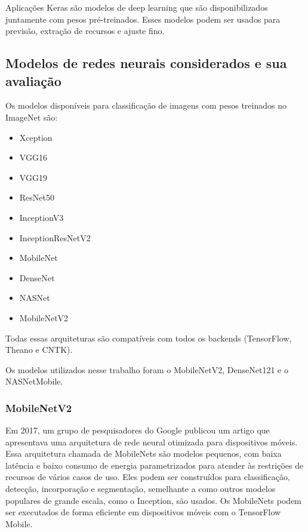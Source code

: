 Aplicações Keras são modelos de deep learning que são disponibilizados juntamente com pesos pré-treinados. Esses modelos podem ser usados para previsão, extração de recursos e ajuste fino.


\subsection{Modelos de redes neurais considerados e sua avaliação}


Os modelos disponíveis para classificação de imagens com pesos treinados no ImageNet são:

\begin{itemize}
    \item Xception
    \item VGG16
    \item VGG19
    \item ResNet50
    \item InceptionV3
    \item InceptionResNetV2
    \item MobileNet
    \item DenseNet
    \item NASNet
    \item MobileNetV2
\end{itemize}

Todas essas arquiteturas são compatíveis com todos os backends (TensorFlow, Theano e CNTK).

Os modelos utilizados nesse trabalho foram o MobileNetV2, DenseNet121 e o NASNetMobile.

\subsubsection{MobileNetV2}
Em 2017, um grupo de pesquisadores do Google publicou um artigo que apresentava uma arquitetura de rede neural otimizada para dispositivos móveis. Essa arquitetura chamada de MobileNets são modelos pequenos, com baixa latência e baixo consumo de energia parametrizados para atender às restrições de recursos de vários casos de uso. Eles podem ser construídos para classificação, detecção, incorporação e segmentação, semelhante a como outros modelos populares de grande escala, como o Inception, são usados. Os MobileNets podem ser executados de forma eficiente em dispositivos móveis com o TensorFlow Mobile.


